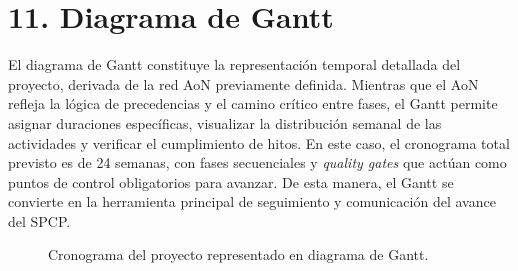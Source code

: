 \documentclass[12pt]
{charter}
\begin{document}
\FloatBarrier

\section{11. Diagrama de Gantt}
\label{sec:gantt}

El diagrama de Gantt constituye la representación temporal detallada del proyecto, derivada de la red AoN previamente definida. 
Mientras que el AoN refleja la lógica de precedencias y el camino crítico entre fases, el Gantt permite asignar duraciones específicas, visualizar la distribución semanal de las actividades y verificar el cumplimiento de hitos. 
En este caso, el cronograma total previsto es de 24 semanas, con fases secuenciales y \textit{quality gates} que actúan como puntos de control obligatorios para avanzar. 
De esta manera, el Gantt se convierte en la herramienta principal de seguimiento y comunicación del avance del SPCP.

\begin{figure}[ht]
  \caption{Cronograma del proyecto representado en diagrama de Gantt.}
  \label{fig:gantt_p03}
\end{figure}
\FloatBarrier
\end{document}

